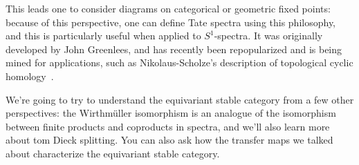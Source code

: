 This leads one to consider diagrams on categorical or geometric fixed points: because of this perspective, one can
define Tate spectra using this philosophy, and this is particularly useful when applied to $S^1$-spectra. It was
originally developed by John Greenlees, and has recently been repopularized and is being mined for applications,
such as Nikolaus-Scholze's description of topological cyclic homology~\cite{NikolausScholze}.

We're going to try to understand the equivariant stable category from a few other perspectives: the Wirthmüller
isomorphism is an analogue of the isomorphism between finite products and coproducts in spectra, and we'll also
learn more about tom Dieck splitting. You can also ask how the transfer maps we talked about
characterize the equivariant stable category.
